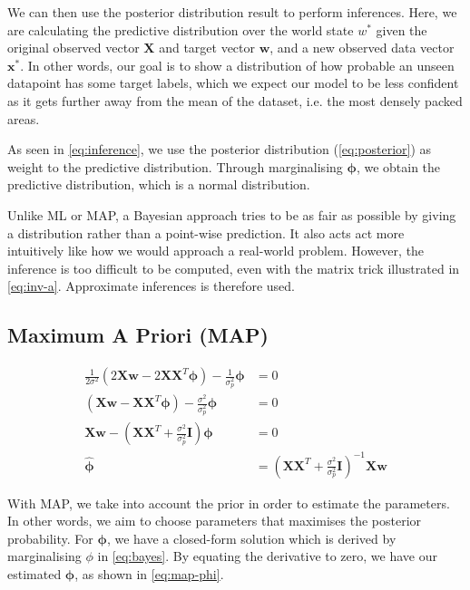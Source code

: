 \documentclass[11pt,openright,a4paper]{article}
\numberwithin{equation}{section}
\begin{document}
We can then use the posterior distribution result to perform inferences. Here, we are calculating the predictive distribution over the world state $w^*$ given the original observed vector $\mathbf{X}$ and target vector $\mathbf{w}$, and a new observed data vector $\mathbf{x}^*$. In other words, our goal is to show a distribution of how probable an unseen datapoint has some target labels, which we expect our model to be less confident as it gets further away from the mean of the dataset, i.e. the most densely packed areas.

As seen in \autoref{eq:inference}, we use the posterior distribution (\autoref{eq:posterior}) as weight to the predictive distribution. Through marginalising $\boldsymbol\phi$, we obtain the predictive distribution, which is a normal distribution. 

Unlike ML or MAP, a Bayesian approach tries to be as fair as possible by giving a distribution rather than a point-wise prediction. It also acts act more intuitively like how we would approach a real-world problem. However, the inference is too difficult to be computed, even with the matrix trick illustrated in \autoref{eq:inv-a}. Approximate inferences is therefore used. 

\subsection{Maximum A Priori (MAP)}

\begin{equation} \label{eq:map-phi}
    \begin{aligned}
        \frac{1}{2\sigma^2}
            \left ( 2 \mathbf{Xw} - 2 \mathbf{XX}^T \boldsymbol{\phi} \right ) -
            \frac{1}{\sigma_p^2} \boldsymbol\phi &= 0
        \\
        \left ( \mathbf{Xw} - \mathbf{XX}^T\boldsymbol\phi \right ) -
            \frac{\sigma^2}{\sigma_p^2}\boldsymbol\phi &= 0
        \\
        \mathbf{Xw} - \left ( \mathbf{XX}^T + \frac{\sigma^2}{\sigma_p^2} \mathbf{I}  \right ) \boldsymbol\phi &= 0
        \\
        \hat{\boldsymbol\phi} &= 
            \left ( \mathbf{XX}^T + \frac{\sigma^2}{\sigma_p^2} \mathbf{I} \right )^{-1} \mathbf{Xw}
    \end{aligned}
\end{equation}

With MAP, we take into account the prior in order to estimate the parameters. In other words, we aim to choose parameters that maximises the posterior probability. For $\boldsymbol\phi$, we have a closed-form solution which is derived by marginalising $\phi$ in \autoref{eq:bayes}. By equating the derivative to zero, we have our estimated $\boldsymbol\phi$, as shown in \autoref{eq:map-phi}.
\end{document}
